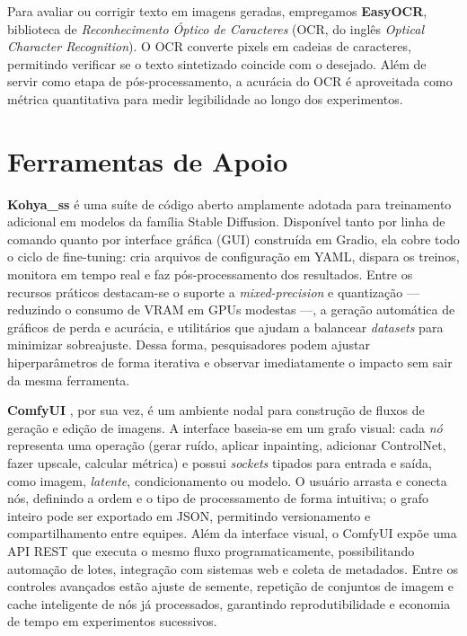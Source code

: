 \documentclass[12pt, %
openright, 
oneside, %
a4paper,    %
brazil]{facom-ufu-abntex2}
\begin{document}
Para avaliar ou corrigir texto em imagens geradas, empregamos \textbf{EasyOCR}, biblioteca de \emph{Reconhecimento Óptico de Caracteres} (OCR, do inglês \emph{Optical Character Recognition}). O OCR converte pixels em cadeias de caracteres, permitindo verificar se o texto sintetizado coincide com o desejado. Além de servir como etapa de pós-processamento, a acurácia do OCR é aproveitada como métrica quantitativa para medir legibilidade ao longo dos experimentos.

\section{Ferramentas de Apoio}

\textbf{Kohya\_ss} \cite{kohya_ss} é uma suíte de código aberto amplamente adotada para treinamento adicional em modelos da família Stable Diffusion. Disponível tanto por linha de comando quanto por interface gráfica (GUI) construída em Gradio, ela cobre todo o ciclo de fine-tuning: cria arquivos de configuração em YAML, dispara os treinos, monitora em tempo real e faz pós-processamento dos resultados. Entre os recursos práticos destacam-se o suporte a \emph{mixed-precision} e quantização — reduzindo o consumo de VRAM em GPUs modestas —, a geração automática de gráficos de perda e acurácia, e utilitários que ajudam a balancear \emph{datasets} para minimizar sobreajuste. Dessa forma, pesquisadores podem ajustar hiperparâmetros de forma iterativa e observar imediatamente o impacto sem sair da mesma ferramenta.

\textbf{ComfyUI} \cite{comfyui}, por sua vez, é um ambiente nodal para construção de fluxos de geração e edição de imagens. A interface baseia-se em um grafo visual: cada \emph{nó} representa uma operação (gerar ruído, aplicar inpainting, adicionar ControlNet, fazer upscale, calcular métrica) e possui \emph{sockets} tipados para entrada e saída, como imagem, \emph{latente}, condicionamento ou modelo. O usuário arrasta e conecta nós, definindo a ordem e o tipo de processamento de forma intuitiva; o grafo inteiro pode ser exportado em JSON, permitindo versionamento e compartilhamento entre equipes. Além da interface visual, o ComfyUI expõe uma API REST que executa o mesmo fluxo programaticamente, possibilitando automação de lotes, integração com sistemas web e coleta de metadados. Entre os controles avançados estão ajuste de semente, repetição de conjuntos de imagem e cache inteligente de nós já processados, garantindo reprodutibilidade e economia de tempo em experimentos sucessivos.
\end{document}

